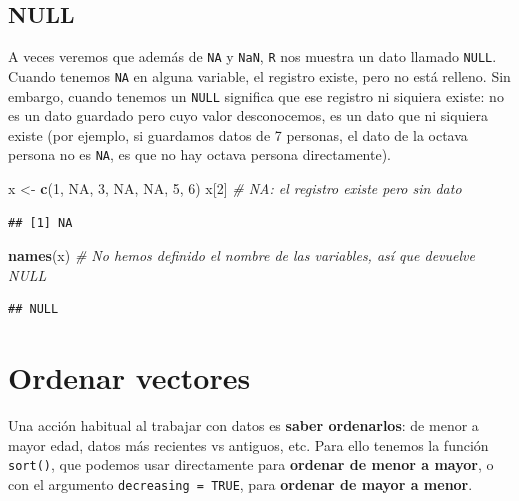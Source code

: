 \documentclass[11pt,]{book}
\newenvironment{Shaded}{\begin{snugshade}}{\end{snugshade}}
\newcommand{\CommentTok}[1]{\textcolor[rgb]{0.37,0.37,0.37}{\textit{#1}}}
\newcommand{\DecValTok}[1]{\textcolor[rgb]{0.06,0.06,0.06}{#1}}
\newcommand{\KeywordTok}[1]{\textcolor[rgb]{0.27,0.27,0.27}{\textbf{#1}}}
\newcommand{\NormalTok}[1]{#1}
\newcommand{\OtherTok}[1]{\textcolor[rgb]{0.37,0.37,0.37}{#1}}
\newcommand{\StringTok}[1]{\textcolor[rgb]{0.5,0.5,0.5}{#1}}
\begin{document}
\hypertarget{null}{%
\subsection{NULL}\label{null}}

A veces veremos que además de \texttt{NA} y \texttt{NaN}, \texttt{R} nos muestra un dato llamado \texttt{NULL}. Cuando tenemos \texttt{NA} en alguna variable, el registro existe, pero no está relleno. Sin embargo, cuando tenemos un \texttt{NULL} significa que ese registro ni siquiera existe: no es un dato guardado pero cuyo valor desconocemos, es un dato que ni siquiera existe (por ejemplo, si guardamos datos de 7 personas, el dato de la octava persona no es \texttt{NA}, es que no hay octava persona directamente).

\begin{Shaded}
\begin{Highlighting}[]
\NormalTok{x <-}\StringTok{ }\KeywordTok{c}\NormalTok{(}\DecValTok{1}\NormalTok{, }\OtherTok{NA}\NormalTok{, }\DecValTok{3}\NormalTok{, }\OtherTok{NA}\NormalTok{, }\OtherTok{NA}\NormalTok{, }\DecValTok{5}\NormalTok{, }\DecValTok{6}\NormalTok{)}
\NormalTok{x[}\DecValTok{2}\NormalTok{] }\CommentTok{# NA: el registro existe pero sin dato}
\end{Highlighting}
\end{Shaded}

\begin{verbatim}
## [1] NA
\end{verbatim}

\begin{Shaded}
\begin{Highlighting}[]
\KeywordTok{names}\NormalTok{(x) }\CommentTok{# No hemos definido el nombre de las variables, así que devuelve NULL}
\end{Highlighting}
\end{Shaded}

\begin{verbatim}
## NULL
\end{verbatim}

\hypertarget{ordenar-vectores}{%
\section{Ordenar vectores}\label{ordenar-vectores}}

Una acción habitual al trabajar con datos es \textbf{saber ordenarlos}: de menor a mayor edad, datos más recientes vs antiguos, etc. Para ello tenemos la función \texttt{sort()}, que podemos usar directamente para \textbf{ordenar de menor a mayor}, o con el argumento \texttt{decreasing\ =\ TRUE}, para \textbf{ordenar de mayor a menor}.
\end{document}
